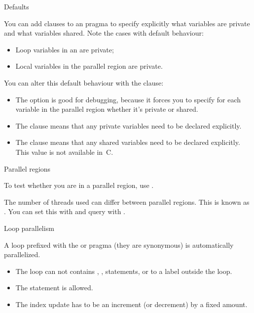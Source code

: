  {Defaults}

You can add clauses to an  pragma
to specify explicitly what variables are private and what variables shared.
Note the cases with default behaviour:
\begin{itemize}
\item Loop variables in an  are private;
\item Local variables in the parallel region are private.
\end{itemize}
You can alter this default behaviour with the  clause:
\begin{itemize}
\item The  option is good for debugging, 
  because it forces you to specify for each variable in the parallel region
  whether it's private or shared.
\item The  clause means that any private variables
  need to be declared explicitly.
\item The  clause means that any shared variables
  need to be declared explicitly. This value is not available in~C.
\end{itemize}

 {Parallel regions}


To test whether you are in a parallel region, use
.

The number of threads used can differ between parallel regions. This is known
as . You can set this with
 and query with
.


 {Loop parallelism}

A loop prefixed with the  or  pragma
(they are synonymous) is automatically parallelized.
\begin{itemize}
\item The loop can not contains , ,  statements, or
   to a label outside the loop.
\item The  statement is allowed.
\item The index update has to be an increment (or decrement) by a fixed amount.
\end{itemize}

